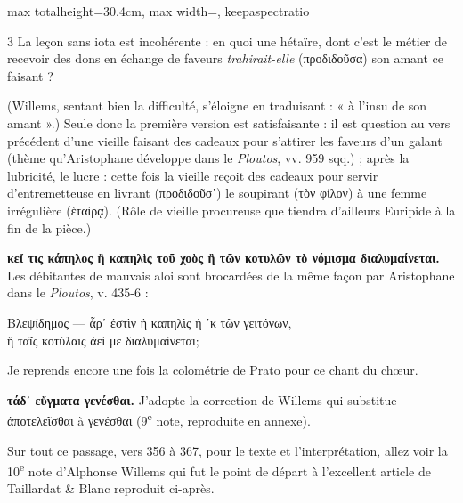 \documentclass[11pt,twoside]{book}
\newcommand{\italique}[1]{\textit{#1}}
\newcommand{\citComm}[1]{\begin{quoting}[vskip=0.4pt,leftmargin=0.7em,rightmargin=0.2em]#1\end{quoting}}
\newcommand{\nieme}[1]{#1\textsuperscript{e}}
\newcommand{\grec}[1]{{\policeGr #1}}
\begin{document}
\begin{adjustbox}{max totalheight=30.4cm, max width=\textwidth, keepaspectratio}
\begin{minipage}{\textwidth}
{\begin{multicols}{3}
\noindent La leçon sans iota est incohérente : en quoi une hétaïre, dont c'est le métier de recevoir des dons en échange de faveurs \italique{trahirait-elle} (\grec{προδιδοῦσα}) son amant ce faisant ?
\par\vspace{1.5pt}
\noindent (Willems, sentant bien la difficulté, s'éloigne en traduisant : « à l'insu de son amant ».)  Seule donc la première version est satisfaisante : il est question au vers précédent d'une vieille faisant des cadeaux pour s'attirer les faveurs d'un galant (thème qu'Aristophane développe dans le \italique{Ploutos}, vv. 959 sqq.) ; après la lubricité, le lucre : cette fois la vieille reçoit des cadeaux pour servir d'entremetteuse en livrant (προδιδοῦσ᾽) le soupirant (τὸν φίλον) à une femme irrégulière (ἑταίρᾳ). (Rôle de vieille procureuse que tiendra d'ailleurs Euripide à la fin de la pièce.)
\par\vspace{1.5pt}
 \textbf{κεἴ τις κάπηλος ἢ καπηλὶς τοῦ χοὸς ἢ τῶν κοτυλῶν τὸ νόμισμα διαλυμαίνεται.} Les débitantes de mauvais aloi sont brocardées de la même façon par Aristophane dans le \italique{Ploutos}, v. 435-6 :
\citComm{Βλεψίδημος — ἆρ᾽ ἐστὶν ἡ καπηλὶς ἡ ᾽κ τῶν γειτόνων,\\
ἣ ταῖς κοτύλαις ἀεί με διαλυμαίνεται;}
\par\vspace{1.5pt}
 \textbf{} Je reprends encore une fois la colométrie de Prato pour ce chant du chœur.
\par\vspace{1.5pt}
 \textbf{τάδ᾽ εὔγματα γενέσθαι.} J'adopte la correction de Willems qui substitue ἀποτελεῖσθαι à γενέσθαι (\nieme{9} note, reproduite en annexe).
\par\vspace{1.5pt}
 \textbf{} Sur tout ce passage, vers 356 à 367, pour le texte et l'interprétation, allez voir la \nieme{10} note d'Alphonse Willems qui fut le point de départ à l'excellent article de Taillardat \& Blanc reproduit ci-après.
\par\vspace{1.5pt}

\end{multicols}}
\end{minipage}
\end{adjustbox}
\end{document}
